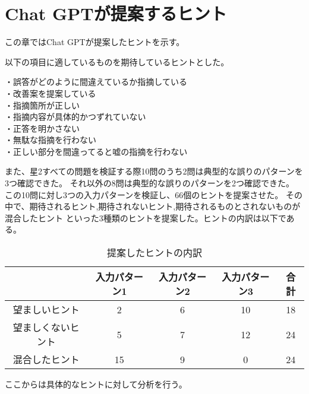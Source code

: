 \chapter{Chat GPTが提案するヒント}
この章ではChat GPTが提案したヒントを示す。

以下の項目に適しているものを期待しているヒントとした。\\
\begin{screen}
・誤答がどのように間違えているか指摘している\\
・改善案を提案している\\
・指摘箇所が正しい\\
・指摘内容が具体的かつずれていない\\
・正答を明かさない\\
・無駄な指摘を行わない\\
・正しい部分を間違ってると嘘の指摘を行わない
\end{screen}
また、星2すべての問題を検証する際10問のうち2問は典型的な誤りのパターンを3つ確認できた。
それ以外の8問は典型的な誤りのパターンを2つ確認できた。
この10問に対し3つの入力パターンを検証し、66個のヒントを提案させた。
その中で、期待されるヒント,期待されないヒント,期待されるものとされないものが混合したヒント
といった3種類のヒントを提案した。ヒントの内訳は以下である。

\begin{table}[h]
    \centering
    \caption{提案したヒントの内訳}
    \label{tab:67}
    \begin{adjustbox}{center}
    \begin{tabular}{|c|c|c|c|c|}%
        \hline
         & 入力パターン1 & 入力パターン2 & 入力パターン3 & 合計 \\ \hline
        望ましいヒント & 2 & 6 & 10 & 18\\ \hline
        望ましくないヒント & 5 & 7 & 12 & 24\\ \hline
        混合したヒント & 15 & 9 & 0 & 24\\ \hline
    \end{tabular}
    \end{adjustbox}
\end{table}
ここからは具体的なヒントに対して分析を行う。

